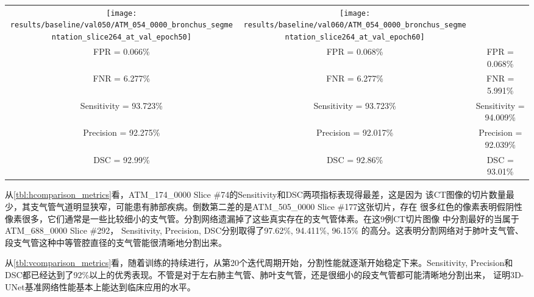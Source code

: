 \begin{enumerate}
\begin{table}[ht]
{\begin{tabular}{|c|c|c|}
            \texttt{[image: results/baseline/val050/ATM\_054\_0000\_bronchus\_segmentation\_slice264\_at\_val\_epoch50]} & 
            \texttt{[image: results/baseline/val060/ATM\_054\_0000\_bronchus\_segmentation\_slice264\_at\_val\_epoch60]} \\
            FPR = 0.066\%          & FPR = 0.068\%             & FPR = 0.068\% \\
            FNR = 6.277\%          & FNR = 6.277\%             & FNR = 5.991\% \\
            Sensitivity = 93.723\% & Sensitivity = 93.723\%    & Sensitivity = 94.009\% \\
            Precision = 92.275\%   & Precision = 92.017\%      & Precision = 92.039\% \\
            DSC = 92.99\%          & DSC = 92.86\%             & DSC = 93.01\% \\
            \hline
        \end{tabular}
        }
    \end{table}

\end{enumerate}

从\autoref{tbl:hcomparison_metrics}看，ATM\_174\_0000 Slice \#74的Sensitivity和DSC两项指标表现得最差，这是因为
该CT图像的切片数量最少，其支气管气道明显狭窄，可能患有肺部疾病。倒数第二差的是ATM\_505\_0000 Slice \#177这张切片，存在
很多红色的像素表明假阴性像素很多，它们通常是一些比较细小的支气管。分割网络遗漏掉了这些真实存在的支气管体素。在这9例CT切片图像
中分割最好的当属于ATM\_688\_0000 Slice \#292， Sensitivity, Precision, DSC分别取得了97.62\%, 94.411\%, 96.15\%
的高分。这表明分割网络对于肺叶支气管、段支气管这种中等管腔直径的支气管能很清晰地分割出来。

从\autoref{tbl:vcomparison_metrics}看，随着训练的持续进行，从第20个迭代周期开始，分割性能就逐渐开始稳定下来。Sensitivity,
Precision和DSC都已经达到了92\%以上的优秀表现。不管是对于左右肺主气管、肺叶支气管，还是很细小的段支气管都可能清晰地分割出来，
证明3D-UNet基准网络性能基本上能达到临床应用的水平。

